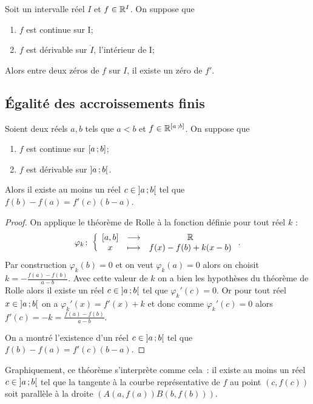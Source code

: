 \begin{corth}
  Soit un intervalle réel \(I\) et \(f \in \mathbb{R}^I\). On suppose que
  \begin{enumerate}
    \item \(f\) est continue sur I;
    \item \(f\) est dérivable sur \(\mathring{I}\), l'intérieur de I;
  \end{enumerate}
  Alors entre deux zéros de \(f\) sur \(I\), il existe un zéro de \(f'\).
\end{corth}

\subsection{Égalité des accroissements finis}

\begin{theo}
  Soient deux réels \(a,b\) tels que \(a < b\) et \(f \in 
  \mathbb{R}^{\left[ a \, ; {} b \right]}\). On suppose que
  \begin{enumerate}
    \item \(f\) est continue sur \(\left[ a \, ; {} b \right]\);
    \item \(f\) est dérivable sur \(\left] a \, ; {} b \right[\).
  \end{enumerate}
Alors il existe au moins un réel \(c \in \left] a \, ; {} b \right[\) tel que 
\(f(b)-f(a)=f'(c)(b-a)\). \end{theo}
\begin{proof}
  On applique le théorème de Rolle à la fonction définie pour tout réel \(k\) :
  \begin{equation}
    \varphi_k\colon\left\{\begin{array}{ccc}[a,b] & \longrightarrow &\mathbb{R}\\x & \longmapsto & f(x)-f(b)+k(x-b)\end{array}\right..
  \end{equation}
  Par construction \(\varphi_k(b)=0\) et on veut \(\varphi_k(a)=0\) alors on 
  choisit \(k = -\frac{f(a)-f(b)}{a-b}\). Avec cette valeur de \(k\) on a bien 
  les hypothèses du théorème de Rolle alors il existe un réel \(c \in 
  \left] a \, ; {} b \right[\) tel que \(\varphi_k'(c)=0\). Or pour tout réel \(x \in 
  \left] a \, ; {} b \right[\) on a \(\varphi_k'(x)=f'(x)+k\) et donc comme 
  \(\varphi_k'(c)=0\) alors \(f'(c)=-k=\frac{f(a)-f(b)}{a-b}\).

  On a montré l'existence d'un réel \(c \in \left] a \, ; {} b \right[\) tel que 
  \(f(b)-f(a)=f'(c)(b-a)\).
\end{proof}

Graphiquement, ce théorème s'interprète comme cela~: il existe au moins un réel 
\(c \in \left] a \, ; {} b \right[\) tel que la tangente à la courbe représentative de 
\(f\) au point \((c,f(c))\) soit parallèle à la droite \((A(a,f(a))B(b,f(b)))\).

